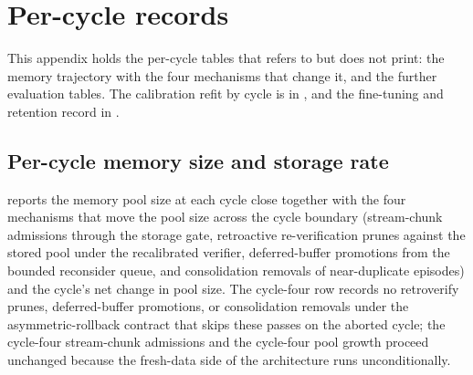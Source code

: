 
\chapter{Per-cycle records}
\label{app:per-cycle}

This appendix holds the per-cycle tables that  refers to but does not print: the memory trajectory with the four mechanisms that change it, and the further evaluation tables. The calibration refit by cycle is in , and the fine-tuning and retention record in .

\section{Per-cycle memory size and storage rate}
\label{app:per-cycle-memory}

 reports the memory pool size at each cycle close together with the four mechanisms that move the pool size across the cycle boundary (stream-chunk admissions through the storage gate, retroactive re-verification prunes against the stored pool under the recalibrated verifier, deferred-buffer promotions from the bounded reconsider queue, and consolidation removals of near-duplicate episodes) and the cycle's net change in pool size. The cycle-four row records no retroverify prunes, deferred-buffer promotions, or consolidation removals under the asymmetric-rollback contract that skips these passes on the aborted cycle; the cycle-four stream-chunk admissions and the cycle-four pool growth proceed unchanged because the fresh-data side of the architecture runs unconditionally.


